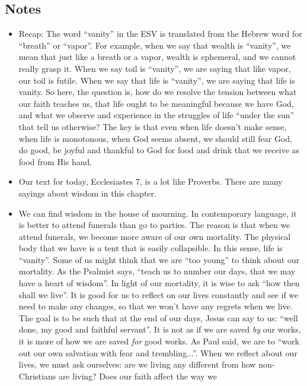 \subsection*{Notes}
\begin{itemize}
  \item{Recap: The word ``vanity'' in the ESV is translated from the Hebrew
  word for ``breath'' or ``vapor''.  For example, when we say that wealth is
  ``vanity'', we mean that just like a breath or a vapor, wealth is
  ephemeral, and we cannot really grasp it.  When we say toil is ``vanity'',
  we are saying that like vapor, our toil is futile.  When we say that life
  is ``vanity'', we are saying that life is vanity.  So here, the question
  is, how do we resolve the tension between what our faith teaches us, that
  life ought to be meaningful because we have God, and what we observe and
  experience in the struggles of life ``under the sun'' that tell us
  otherwise?  The key is that even when life doesn't make sense, when life is
  monotonous, when God seems absent, we should still fear God, do good, be
  joyful and thankful to God for food and drink that we receive as food from
  His hand.}
  \item{Our text for today, Ecclesiastes 7, is a lot like Proverbs.  There
  are many sayings about wisdom in this chapter.}
  \item{We can find wisdom in the house of mourning.  In contemporary
  language, it is better to attend funerals than go to parties.  The reason
  is that when we attend funerals, we become more aware of our own mortality.
  The physical body that we have is a tent that is easily collapsible.  In
  this sense, life is ``vanity''.  Some of us might think that we are ``too
  young'' to think about our mortality.  As the Psalmist says, ``teach us to
  number our days, that we may have a heart of wisdom''.  In light of our
  mortality, it is wise to ask ``how then shall we live''.  It is good for us
  to reflect on our lives constantly and see if we need to make any changes,
  so that we won't have any regrets when we live.  The goal is to be such
  that at the end of our days, Jesus can say to us: ``well done, my good and
  faithful servant''.  It is not as if we are saved \textit{by} our works, it
  is more of how we are saved \textit{for} good works.  As Paul said, we are
  to ``work out our own salvation with fear and trembling...''.  When we
  reflect about our lives, we must ask ourselves: are we living any different
  from how non-Christians are living?  Does our faith affect the way we
}
\end{itemize}
